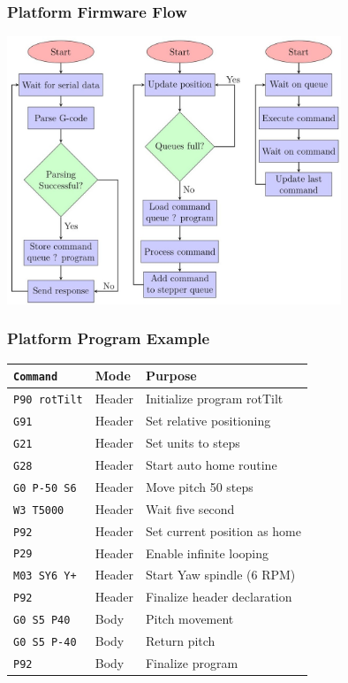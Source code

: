 \documentclass[aspectratio=43]{beamer}
\begin{document}
\begin{frame}[fragile]
  \frametitle{Platform Firmware Flow}

  \centering
  \includegraphics[width=0.75\textwidth]{../img/platform_flow.jpg}

\end{frame}

\begin{frame}[fragile]
  \frametitle{Platform Program Example}
  \begin{tabular}{lll}
    \hline
    \texttt{Command}     & Mode   & Purpose                      \\
    \hline
    \texttt{P90 rotTilt} & Header & Initialize program rotTilt   \\
    \texttt{G91}         & Header & Set relative positioning     \\
    \texttt{G21}         & Header & Set units to steps           \\
    \texttt{G28}         & Header & Start auto home routine      \\
    \texttt{G0 P-50 S6}  & Header & Move pitch 50 steps          \\
    \texttt{W3 T5000}    & Header & Wait five second             \\
    \texttt{P92}         & Header & Set current position as home \\
    \texttt{P29}         & Header & Enable infinite looping      \\
    \texttt{M03 SY6 Y+}  & Header & Start Yaw spindle (6 RPM)    \\
    \texttt{P92}         & Header & Finalize header declaration  \\
    \texttt{G0 S5 P40}   & Body   & Pitch movement               \\
    \texttt{G0 S5 P-40}  & Body   & Return pitch                 \\
    \texttt{P92}         & Body   & Finalize program             \\
    \hline
  \end{tabular}
\end{frame}
\end{document}
